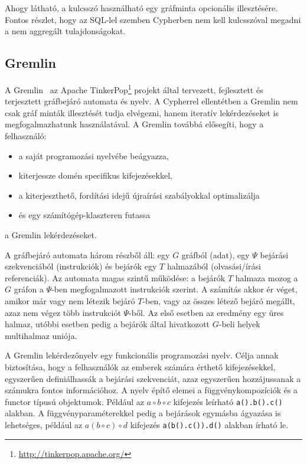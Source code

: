 Ahogy látható, a  kulcsszó használható egy gráfminta opcionális illesztésére. Fontos részlet, hogy az SQL-lel szemben Cypherben nem kell  kulcsszóval megadni a nem aggregált tulajdonságokat.

\subsection{Gremlin}
A Gremlin~\cite{DBLP:conf/dbpl/Rodriguez15} az Apache TinkerPop\footnote{\url{http://tinkerpop.apache.org/}} projekt által tervezett, fejlesztett és terjesztett gráfbejáró automata és nyelv. A Cypherrel ellentétben a Gremlin nem csak gráf minták illesztését tudja elvégezni, hanem iteratív lekérdezéseket is megfogalmazhatunk használatával. A Gremlin továbbá elősegíti, hogy a felhasználó:
\begin{itemize}
	\item a saját programozási nyelvébe beágyazza,
	\item kiterjessze domén specifikus kifejezésekkel,
	\item a kiterjeszthető, fordítási idejű újraírási szabályokkal optimalizálja
	\item és egy számítógép-klaszteren futassa
\end{itemize}
a Gremlin lekérdezéseket.

A gráfbejáró automata három részből áll: egy $G$ gráfból (adat), egy $\Psi$ bejárási szekvenciából (instrukciók) és bejárók egy $T$ halmazából (olvasási/írási referenciák). Az automata magas szintű működése: a bejárók $T$ halmaza mozog a $G$ gráfon a $\Psi$-ben megfogalmazott instrukciók szerint. A számítás akkor ér véget, amikor már vagy nem létezik bejáró $T$-ben, vagy az összes létező bejáró megállt, azaz nem végez több instrukciót $\Psi$-ből. Az első esetben az eredmény egy üres halmaz, utóbbi esetben pedig a bejárók által hivatkozott $G$-beli helyek multihalmaz uniója.

A Gremlin lekérdezőnyelv egy funkcionális programozási nyelv. Célja annak biztosítása, hogy a felhasználók az emberek számára érthető kifejezésekkel, egyszerűen definiálhassák a bejárási szekvenciát, azaz egyszerűen hozzájussanak a számukra fontos információhoz. A nyelv építő elemei a függvénykompozíciók és a functor típusú objektumok. Például az $a \circ b \circ c$ kifejezés leírható \lstinline{a().b().c()} alakban. A függvényparaméterekkel pedig a bejárások egymásba ágyazása is lehetséges, például az $a (b \circ c) \circ d$ kifejezés \lstinline{a(b().c()).d()} alakban írható le.

